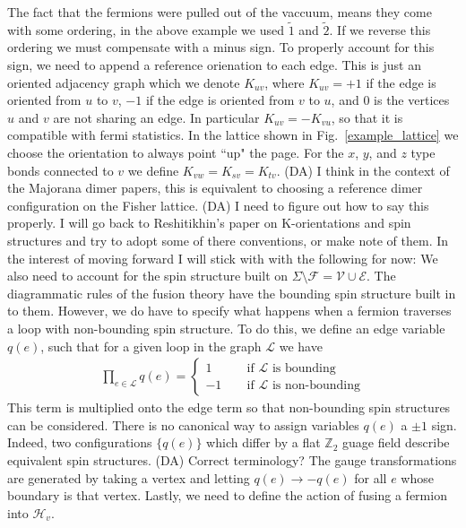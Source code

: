 \documentclass[12pt,a4paper]{article}
\newcounter{arrow}
\newcommand{\dave}[1]{{\color{ao(english)}\footnotesize{(DA) #1}}}
\begin{document}
The fact that the fermions were pulled out of the vaccuum, means they come with some ordering, in the above example we used $\tilde{1}$ and $\tilde{2}$. 
If we reverse this ordering we must compensate with a minus sign.
To properly account for this sign, we need to append a reference orienation to each edge. 
This is just an oriented adjacency graph which we denote $K_{uv}$, where $K_{uv} = +1$ if the edge is oriented from $u$ to $v$, $-1$ if the edge is oriented from $v$ to $u$, and $0$ is the vertices $u$ and $v$ are not sharing an edge.
In particular $K_{uv} = - K_{vu}$, so that it is compatible with fermi statistics. 
In the lattice shown in Fig.~\ref{example_lattice} we choose the orientation to always point ``up" the page.
For the $x$, $y$, and $z$ type bonds connected to $v$ we define $K_{vw} = K_{sv} = K_{tv}$. 
\dave{I think in the context of the Majorana dimer papers, this is equivalent to choosing a reference dimer configuration on the Fisher lattice.}
\dave{I need to figure out how to say this properly. I will go back to Reshitikhin's paper on K-orientations and spin structures and try to adopt some of there conventions, or make note of them. In the interest of moving forward I will stick with with the following for now:}
We also need to account for the spin structure built on $\Sigma \setminus  \mathcal{F} = \mathcal{V} \cup \mathcal{E}$. 
The diagrammatic rules of the fusion theory have the bounding spin structure built in to them. 
However, we do have to specify what happens when a fermion traverses a loop with non-bounding spin structure.
To do this, we define an edge variable $q(e)$, such that for a given loop in the graph $\mathcal{L}$ we have 
\begin{align}
\prod_{e \in \mathcal{L} } q(e) = 
\left\{
                \begin{array}{ll}
1 \quad \quad & \text{if $\mathcal{L}$ is bounding} \\
-1 &\text{if $\mathcal{L}$ is non-bounding} 
                \end{array} \right.
\end{align}
This term is multiplied onto the edge term so that non-bounding spin structures can be considered.
There is no canonical way to assign variables $q(e)$ a $\pm1$ sign.
Indeed, two configurations $\{ q(e) \}$ which differ by a flat $\mathbb{Z}_2$ guage field describe equivalent spin structures. 
\dave{Correct terminology?}
The gauge transformations are generated by taking a vertex and letting $q(e) \rightarrow -q(e)$ for all $e$ whose boundary is that vertex.
Lastly, we need to define the action of fusing a fermion into $\mathcal{H}_v$.
\end{document}
